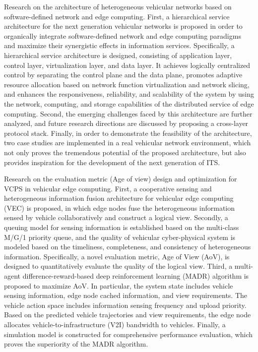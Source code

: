 \begin{eabstract}
 Research on the architecture of heterogeneous vehicular networks based on software-defined network and edge computing.
First, a hierarchical service architecture for the next generation vehicular networks is proposed in order to organically integrate software-defined network and edge computing paradigms  and maximize their synergistic effects in information services. 
Specifically, a hierarchical service architecture is designed, consisting of application layer, control layer, virtualization layer, and data layer. 
It achieves logically centralized control by separating the control plane and the data plane, promotes adaptive resource allocation based on network function virtualization and network slicing, and enhances the responsiveness, reliability, and scalability of the system by using the network, computing, and storage capabilities of the distributed service of edge computing. 
Second, the emerging challenges faced by this architecture are further analyzed, and future research directions are discussed by proposing a cross-layer protocol stack. 
Finally, in order to demonstrate the feasibility of the architecture, two case studies are implemented in a real vehicular network environment, which not only proves the tremendous potential of the proposed architecture, but also provides inspiration for the development of the next generation of ITS.

 Research on the evaluation metric (Age of view) design and optimization for VCPS in vehicular edge computing.
First, a cooperative sensing and heterogeneous information fusion architecture for vehicular edge computing (VEC) is proposed, in which edge nodes fuse the heterogeneous information sensed by vehicle collaboratively and construct a logical view. 
Secondly, a queuing model for sensing information is established based on the multi-class M/G/1 priority queue, and the quality of vehicular cyber-physical system is modeled based on the timeliness, completeness, and consistency of heterogeneous information. 
Specifically, a novel evaluation metric, Age of View (AoV), is designed to quantitatively evaluate the quality of the logical view. 
Third, a multi-agent difference-reward-based deep reinforcement learning (MADR) algorithm is proposed to maximize AoV. 
In particular, the system state includes vehicle sensing information, edge node cached information, and view requirements. 
The vehicle action space includes information sensing frequency and upload priority. 
Based on the predicted vehicle trajectories and view requirements, the edge node allocates vehicle-to-infrastructure (V2I) bandwidth to  vehicles. 
Finally, a simulation model is constructed for comprehensive performance evaluation, which proves the superiority of the MADR algorithm.


\end{eabstract}
